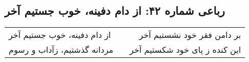 \begin{center}
\section*{رباعی شماره ۴۲: از دام دفینه، خوب جستیم آخر}
\label{sec:042}
\begin{longtable}{l p{0.5cm} r}
از دام دفینه، خوب جستیم آخر
&&
بر دامن فقر خود نشستیم آخر
\\
مردانه گذشتیم، زآداب و رسوم
&&
این کنده ز پای خود شکستیم آخر
\\
\end{longtable}
\end{center}
